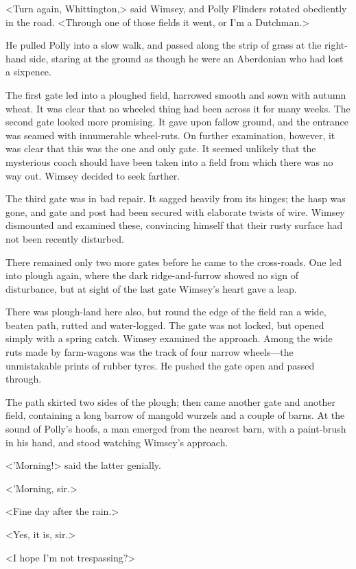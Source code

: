 <Turn again, Whittington,> said Wimsey, and Polly Flinders rotated obediently in the road. <Through one of those fields it went, or I'm a Dutchman.>

He pulled Polly into a slow walk, and passed along the strip of grass at the right-hand side, staring at the ground as though he were an Aberdonian who had lost a sixpence.

The first gate led into a ploughed field, harrowed smooth and sown with autumn wheat. It was clear that no wheeled thing had been across it for many weeks. The second gate looked more promising. It gave upon fallow ground, and the entrance was seamed with innumerable wheel-ruts. On further examination, however, it was clear that this was the one and only gate. It seemed unlikely that the mysterious coach should have been taken into a field from which there was no way out. Wimsey decided to seek farther.

The third gate was in bad repair. It sagged heavily from its hinges; the hasp was gone, and gate and post had been secured with elaborate twists of wire. Wimsey dismounted and examined these, convincing himself that their rusty surface had not been recently disturbed.

There remained only two more gates before he came to the cross-roads. One led into plough again, where the dark ridge-and-furrow showed no sign of disturbance, but at sight of the last gate Wimsey's heart gave a leap.

There was plough-land here also, but round the edge of the field ran a wide, beaten path, rutted and water-logged. The gate was not locked, but opened simply with a spring catch. Wimsey examined the approach. Among the wide ruts made by farm-wagons was the track of four narrow wheels—the unmistakable prints of rubber tyres. He pushed the gate open and passed through.

The path skirted two sides of the plough; then came another gate and another field, containing a long barrow of mangold wurzels and a couple of barns. At the sound of Polly's hoofs, a man emerged from the nearest barn, with a paint-brush in his hand, and stood watching Wimsey's approach.

<'Morning!> said the latter genially.

<'Morning, sir.>

<Fine day after the rain.>

<Yes, it is, sir.>

<I hope I'm not trespassing?>

